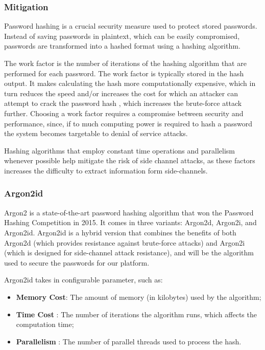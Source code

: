 \subsubsection{Mitigation}

Password hashing is a crucial security measure used to protect stored passwords. Instead of saving passwords in plaintext, which can be easily compromised, passwords are transformed into a hashed format using a hashing algorithm.

The work factor is the number of iterations of the hashing algorithm that are performed for each password. The work factor is typically stored in the hash output. It makes calculating the hash more computationally expensive, which in turn reduces the speed and/or increases the cost for which an attacker can attempt to crack the password hash \cite{owasp_password_storage}, which increases the brute-force attack further.
Choosing a work factor requires a compromise between security and performance, since, if to much computing power is required to hash a password the system becomes targetable to denial of service attacks.

Hashing algorithms that employ constant time operations and parallelism whenever possible help mitigate the risk of side channel attacks, as these factors increases the difficulty to extract information form side-channels.  


\subsubsection{Argon2id}
Argon2\cite{rfc9106} is a state-of-the-art password hashing algorithm that won the Password Hashing Competition in 2015. It comes in three variants: Argon2d, Argon2i, and Argon2id. Argon2id is a hybrid version that combines the benefits of both Argon2d (which provides resistance against brute-force attacks) and Argon2i (which is designed for side-channel attack resistance), and will be the algorithm used to secure the passwords for our platform.

Argon2id takes in configurable parameter, such as:
\begin{itemize}
	\item \textbf{Memory Cost}: The amount of memory (in kilobytes) used by the algorithm;
	\item \textbf{Time Cost} : The number of iterations the algorithm runs, which affects the computation time;
	\item \textbf{Parallelism} : The number of parallel threads used to process the hash.
\end{itemize}

